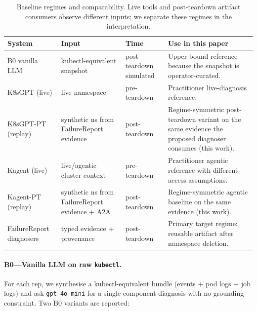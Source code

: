 \documentclass[sigconf, nonacm=true, anonymous=false, review=false]{acmart}
\newcommand{\fp}{FailureReport\xspace}
\begin{document}
\begin{table}[t]
\centering
\caption{Baseline regimes and comparability. Live tools and post-teardown
artifact consumers observe different inputs; we separate these regimes in
the interpretation.}
\label{tab:baseline-regimes}
\small
\setlength{\tabcolsep}{5pt}
\begin{tabularx}{\textwidth}{P{0.16\textwidth} P{0.26\textwidth} P{0.18\textwidth} Y}
\toprule
\textbf{System} & \textbf{Input} & \textbf{Time} & \textbf{Use in this paper} \\
\midrule
B0 vanilla LLM & kubectl-equivalent snapshot & post-teardown simulated &
Upper-bound reference because the snapshot is operator-curated. \\
K8sGPT (live) & live namespace & pre-teardown &
Practitioner live-diagnosis reference. \\
K8sGPT-PT (replay) & synthetic ns from \fp{} evidence & post-teardown &
Regime-symmetric post-teardown variant on the same evidence the
proposed diagnoser consumes (this work). \\
Kagent (live) & live/agentic cluster context & pre-teardown &
Practitioner agentic reference with different access assumptions. \\
Kagent-PT (replay) & synthetic ns from \fp{} evidence + A2A & post-teardown &
Regime-symmetric agentic baseline on the same evidence (this work). \\
\fp{} diagnosers & typed evidence + provenance & post-teardown &
Primary target regime: reusable artifact after namespace deletion. \\
\bottomrule
\end{tabularx}
\end{table}

\paragraph{B0---Vanilla LLM on raw \texttt{kubectl}.} For each rep, we
synthesise a kubectl-equivalent bundle (events + pod logs + job logs)
and ask \texttt{gpt-4o-mini} for a single-component diagnosis with no
grounding constraint. Two B0 variants are reported:
\end{document}
